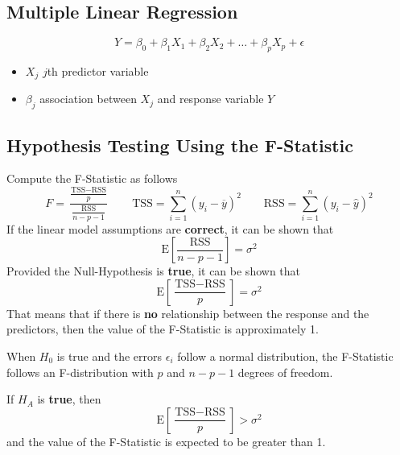\documentclass[11pt]{article}
\newcommand*\samplemean[1]{\overline{#1}}
\newcommand*\ev[1]{\mathrel{\text{E}\left[#1\right]}}
\begin{document}
\subsection{Multiple Linear Regression}
\begin{definition}
	\begin{equation*}
		Y = \beta_0 + \beta_1 X_1 + \beta_2 X_2 + \dots + \beta_p X_p + \epsilon
	\end{equation*}
	\begin{itemize}[label=]
		\item $X_j$ \quad $j$th predictor variable
		\item $\beta_j$ \quad association between $X_j$ and response variable $Y$
	\end{itemize}
\end{definition}

\subsection{Hypothesis Testing Using the F-Statistic}
Compute the F-Statistic as follows
\begin{equation*}
	F = \frac{\frac{\text{TSS} - \text{RSS}}{p}}{\frac{\text{RSS}}{n-p-1}} \qquad \text{TSS} = \sum_{i=1}^{n} (y_i - \samplemean{y})^2 \qquad \text{RSS} = \sum_{i=1}^{n} (y_i - \hat{y})^2
\end{equation*}
If the linear model assumptions are \textbf{correct}, it can be shown that
\begin{equation*}
	\ev{\frac{\text{RSS}}{n-p-1}} = \sigma^2
\end{equation*}
Provided the Null-Hypothesis is \textbf{true}, it can be shown that
\begin{equation*}
	\ev{\frac{\text{TSS}-\text{RSS}}{p}} = \sigma^2
\end{equation*}
That means that if there is \textbf{no} relationship between the response and the predictors, then the value of the F-Statistic is approximately 1.

When $H_0$ is true and the errors $\epsilon_i$ follow a normal distribution, the F-Statistic follows an F-distribution with $p$ and $n-p-1$ degrees of freedom.

If $H_A$ is \textbf{true}, then 
\begin{equation*}
	\ev{\frac{\text{TSS}-\text{RSS}}{p}} > \sigma^2
\end{equation*}
and the value of the F-Statistic is expected to be greater than 1.
\end{document}
